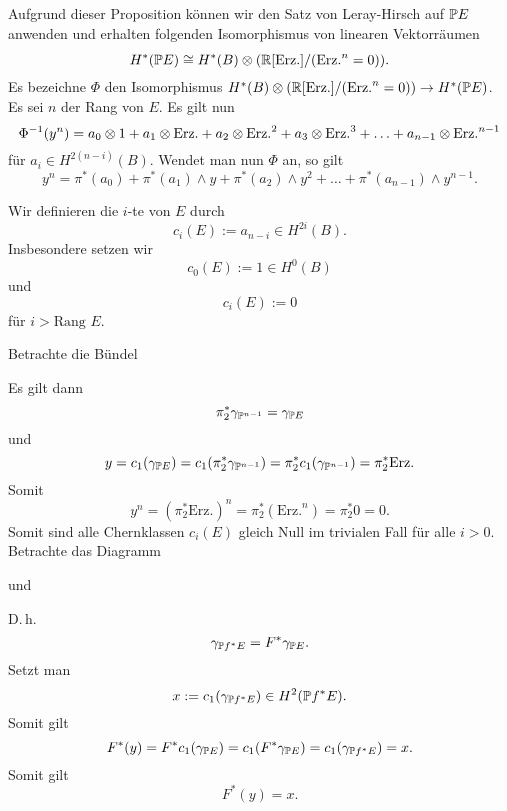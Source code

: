 Aufgrund dieser Proposition können wir den Satz von Leray-Hirsch auf $\P E$ anwenden und erhalten folgenden Isomorphismus von linearen Vektorräumen
\[ H^*(\P E) \isom{}H^*(B) \otimes (\R[\mathrm{Erz.}]/ (\mathrm{Erz.}^n = 0)).  \]
Es bezeichne $\Phi$ den Isomorphismus $H^*(B) \otimes (\R[\mathrm{Erz.}]/ (\mathrm{Erz.}^n = 0)) \pfeil{} H^*(\P E)$. Es sei $n$ der Rang von $E$. Es gilt nun
\[ \Phi\i(y^n) = a_0\otimes 1  
+ a_1\otimes \mathrm{Erz.}
+ a_2\otimes \mathrm{Erz.}^2
+ a_3\otimes \mathrm{Erz.}^3
+ \ldots
+ a_{n-1}\otimes \mathrm{Erz.}^{n-1} \]
für $a_i \in H^{2(n-i)}(B)$. Wendet man nun $\Phi$ an, so gilt
\[ y^n = \pi^*(a_0) + \pi^*(a_1) \wedge y + \pi^*(a_2) \wedge y^2 + \ldots +\pi^*(a_{n-1}) \wedge y^{n-1}.  \]

\Def{}
Wir definieren die $i$-te  von $E$ durch
\[ c_i(E) := a_{n-i} \in H^{2i}(B). \]
Insbesondere setzen wir
\[ c_0(E) := 1 \in H^0(B) \]
und
\[ c_i(E) := 0 \]
für $i > \text{Rang } E.$

Betrachte die Bündel
\begin{center}
\end{center}
Es gilt dann
\[ \pi_2^*\gamma_{\P^{n-1}} = \gamma_{\P E} \]
und
\[ y = c_1(\gamma_{\P E}) = c_1(\pi_2^*\gamma_{\P^{n-1}}) = \pi_2^* c_1(\gamma_{\P^{n-1}}) = \pi_2^*\mathrm{Erz.} \]
Somit
\[ y^n = (\pi_2^*\mathrm{Erz.})^n = \pi_2^*(\mathrm{Erz.}^n) = \pi_2^* 0 = 0. \]
Somit sind alle Chernklassen $c_i(E)$ gleich Null im trivialen Fall für alle $i> 0$.
Betrachte das Diagramm
\begin{center}
\end{center}
und
\begin{center}
\end{center}
D.\,h.
\[ \gamma_{\P f^*E} = F^*\gamma_{\P E}. \]
Setzt man
\[ x:= c_1(\gamma_{\P f^*E}) \in H^2(\P f^* E) .\]
Somit gilt
\[ F^*(y) = F^*c_1(\gamma_{\P E}) = c_1 (F^*\gamma_{\P E}) = c_1(\gamma_{\P f^*E}) = x. \]
Somit gilt
\[ F^*(y) = x. \]

